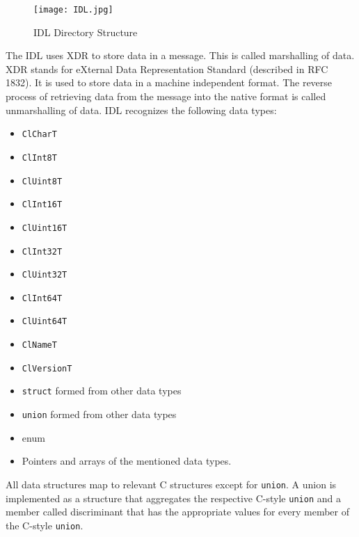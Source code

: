 \newpage
\begin{figure}[htp]
\centering
\texttt{[image: IDL.jpg]}
\caption{IDL Directory Structure}
\end{figure}
\begin{flushleft}
The IDL uses XDR to store data in a message. This is called marshalling of data. 
XDR stands for eXternal Data Representation Standard (described in RFC 1832). It is used to store data in a
machine independent format.
The reverse process of retrieving data from the message into the native
format is called unmarshalling of data.  IDL recognizes the following data types:
\begin{itemize}
\item
{\tt{ClCharT}}
\item
{\tt{ClInt8T}}
\item
{\tt{ClUint8T}}
\item
{\tt{ClInt16T}}
\item
{\tt{ClUint16T}}
\item
{\tt{ClInt32T}}
\item
{\tt{ClUint32T}}
\item
{\tt{ClInt64T}}
\item
{\tt{ClUint64T}}
\item
{\tt{ClNameT}}
\item
{\tt{ClVersionT}}
\item
{\tt{struct}} formed from other data types
\item
{\tt{union}} formed from other data types
\item
enum
\item
Pointers and arrays of the mentioned data types.
\end{itemize}

All data structures map to relevant C structures except for {\tt{union}}. A union is implemented as a structure that aggregates the respective C-style
{\tt{union}} and a member called discriminant that has the appropriate values for every member of the C-style {\tt{union}}.\par


\end{flushleft}
